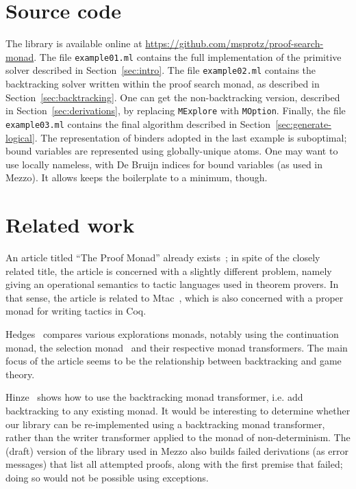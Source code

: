 \documentclass{easychair}
\def\li{\lstinline}
\newcommand{\sref}[1]{Section~\ref{sec:#1}}
\begin{document}
\section{Source code}

The library is available online at
\url{https://github.com/msprotz/proof-search-monad}. The file \li+example01.ml+
contains the full implementation of the primitive solver described in
\sref{intro}. The file \li+example02.ml+ contains the backtracking solver
written within the proof search monad, as described in \sref{backtracking}. One
can get the non-backtracking version, described in \sref{derivations}, by
replacing \li+MExplore+ with \li+MOption+. Finally, the file \li+example03.ml+
contains the final algorithm described in \sref{generate-logical}. The
representation of binders adopted in the last example is suboptimal; bound
variables are represented using globally-unique atoms. One may want to use
locally nameless, with De Bruijn indices for bound variables (as used in Mezzo).
It allows keeps the boilerplate to a minimum, though.

\section{Related work}

An article titled ``The Proof Monad'' already exists~\cite{kirchner-munoz-10};
in spite of the closely related title, the article is concerned with a slightly
different problem, namely giving an operational semantics to tactic languages
used in theorem provers. In that sense, the article is related to
Mtac~\cite{ziliani-13}, which is also concerned with a proper monad for writing
tactics in Coq.

Hedges~\cite{hedges-14} compares various explorations monads, notably using the
continuation monad, the selection monad~\cite{escardo-2010} and their respective
monad transformers. The main focus of the article seems to be the relationship
between backtracking and game theory.

Hinze~\cite{hinze-00} shows how to use the backtracking monad transformer, i.e.
add backtracking to any existing monad. It would be interesting to determine
whether our library can be re-implemented using a backtracking monad
transformer, rather than the writer transformer applied to the monad of
non-determinism. The (draft) version of the library used in Mezzo also builds
failed derivations (as error messages) that list all attempted proofs, along
with the first premise that failed; doing so would not be possible using
exceptions.
\end{document}
